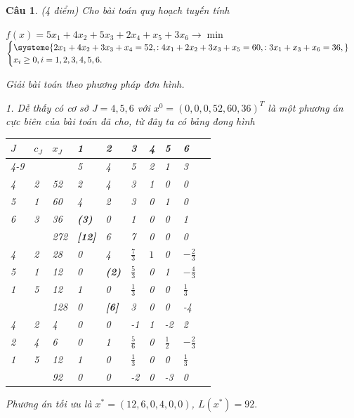 \documentclass[12pt,a4letter]{article}
\newtheorem{btbt}{Câu}%
\newenvironment{cauhoi}{\begin{btbt}\rm }{\end{btbt}}
\begin{document}
\begin{cauhoi}%
(4 điểm)  
Cho bài toán quy hoạch tuyến tính
\begin{center}
 $ f(x)=5x_1+4x_2+5x_3+2x_4+x_5+3x_6\rightarrow\min $\\
$ \begin{cases}
\systeme{
2x_1+4x_2+3x_3+x_4= 52,:
4x_1+2x_2+3x_3+x_5=60,:
3x_1+x_3+x_6=36,}\\
x_i\ge 0, i=1,2,3,4,5,6.
\end{cases} $
\end{center}

Giải bài toán theo phương pháp đơn hình.

\begin{traloi}
1. Dễ thấy có cơ sở $J={4,5,6}$ với $x^0=(0,0,0,52,60,36)^T$ là một phương án cực biên của bài toán đã cho, từ đây ta có bảng đong hình

\begin{center}
\renewcommand{\arraystretch}{1.25}
\begin{tabular}{| l | l | l | l | l | l | l | l | l | l|}
\hline
$J$&$c_J$&$x_J$&1&2&3&4&5&6\\ 
\cline{4-9}
&&&5&4&5&2&1&3\\ 
\hline
4&2   &52   &2  &4 &3 &1&0&0\\
5&1   &60    &4 &2&3 &0&1&0\\
6&3   &36    &\textbf{(3)} &0&1&0&0&1\\
\hline
&&272&\textbf{[12]}&6&7& 0&0&0\\
\hline
4&2   &28   &0  &4 &$\frac{7}{3}$&$1$&0&$-\frac{2}{3}$\\
5&1  &12    &0   &\textbf{(2)}&$\frac{5}{3}$ &0&1&$-\frac{4}{3}$\\
1&5   &12    &1  &0&$\frac{1}{3}$ &0&0&$\frac{1}{3}$\\
\hline
&&128 &0&\textbf{[6]}& 3& 0&0&-4\\
\hline
4&2   &4   &0  &0 &-1&1&-2&2\\
2&4  &6    &0   &1&$\frac{5}{6}$ &0&$\frac{1}{2}$&$-\frac{2}{3}$\\
1&5   &12    &1&0&$\frac{1}{3}$ &0&0&$\frac{1}{3}$\\
\hline
&&92 &0&0& -2& 0&-3&0\\
\hline
\end{tabular}
\end{center}
Phương án tối ưu là $x^*=(12,6,0,4,0,0)$, $L(x^*)=92.$
\end{traloi}
\end{cauhoi}

\newpage
{}
\end{document}
